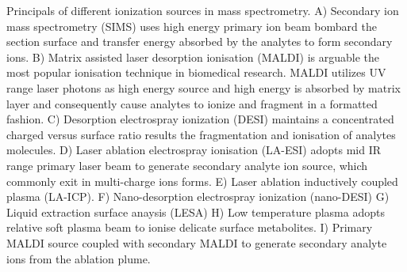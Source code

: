 \label{fig:ionisation}
Principals of different ionization sources in mass spectrometry. A) Secondary ion mass spectrometry (SIMS) uses high energy primary ion beam bombard the section surface and transfer energy absorbed by the analytes to form secondary ions. B) Matrix assisted laser desorption ionisation (MALDI) is arguable the most popular ionisation technique in biomedical research. MALDI utilizes UV range laser photons as high energy source and high energy is absorbed by matrix layer and consequently cause analytes to ionize and fragment in a formatted fashion. C) Desorption electrospray ionization (DESI) maintains a concentrated charged versus surface ratio results the fragmentation and ionisation of analytes molecules. D) Laser ablation electrospray ionisation (LA-ESI) adopts mid IR range primary laser beam to generate secondary analyte ion source, which commonly exit in multi-charge ions forms. E) Laser ablation inductively coupled plasma (LA-ICP). F) Nano-desorption electrospray ionization (nano-DESI) G) Liquid extraction surface anaysis (LESA) H) Low temperature plasma adopts relative soft plasma beam to ionise delicate surface metabolites. I) Primary MALDI source coupled with secondary MALDI to generate secondary analyte ions from the ablation plume. 